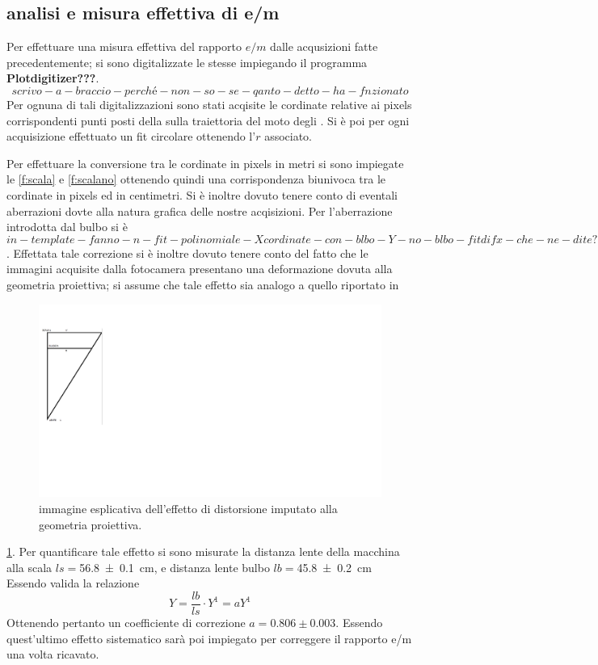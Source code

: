 \subsection{analisi e misura effettiva di e/m} 
	Per effettuare una misura effettiva del rapporto $e/m$ dalle acqusizioni
	fatte precedentemente;
	si sono digitalizzate le stesse impiegando il programma \textbf{Plotdigitizer???}.
	$$scrivo-a-braccio-perché-non-so-se-qanto-detto-ha-fnzionato$$
	Per ognuna di tali digitalizzazioni sono stati acqisite le cordinate relative ai pixels corrispondenti  punti posti della 
	sulla traiettoria del moto degli \e.
	Si è poi per ogni acquisizione effettuato un fit circolare ottenendo l'$r$ associato.
	
	Per effettuare la conversione tra le cordinate in pixels in metri si sono impiegate le \figurename{ \ref{f:scala}} e  \figurename{ \ref{f:scalano}}
	ottenendo quindi una corrispondenza biunivoca tra le cordinate in pixels ed in centimetri.
	Si è inoltre dovuto tenere conto di eventali aberrazioni dovte alla natura grafica
	delle nostre acqisizioni.
	Per l'aberrazione introdotta dal bulbo si è
	$$in-template-fanno-n-fit-polinomiale-Xcordinate-con-blbo-Y-no-blbo-fit di fx-che -ne -dite?$$.
	Effettata tale correzione si è inoltre dovuto tenere conto del fatto che le immagini acquisite dalla fotocamera presentano una deformazione dovuta alla geometria proiettiva;
	si assume che tale effetto sia analogo a quello riportato in 
	\begin{figure}[hb]
		\centering
			\includegraphics[scale=0.5]{./fig/geometria.png}
		
		\caption{immagine esplicativa dell'effetto di distorsione imputato alla geometria proiettiva.}
		\label{fig:geo-p}
		\end{figure}
	\figurename{ \ref{fig:geo-p}}.
	Per quantificare tale effetto si sono misurate la distanza lente della macchina 
	alla scala $ls=$\SI{56.8 \pm 0.1}{\cm}, e distanza lente bulbo  $lb=$\SI{45.8 \pm 0.2}{\cm}
	Essendo valida la relazione \begin{equation}
	Y=\frac{lb}{ls}\cdot Y^1 = a  Y^1
	\end{equation}\label{eq:geom}
	Ottenendo pertanto un coefficiente di correzione  $a=0.806 \pm 0.003$.
	Essendo quest'ultimo effetto sistematico sarà poi impiegato per correggere il rapporto e/m una volta ricavato.
	

